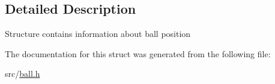 \subsection{Detailed Description}
Structure contains information about ball position 

The documentation for this struct was generated from the following file\-:\begin{DoxyCompactItemize}
\item 
src/\hyperlink{ball_8h}{ball.\-h}\end{DoxyCompactItemize}
